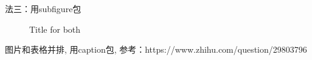 \documentclass{article}
\begin{document}
\begin{CJK}{UTF8}{gbsn}
法三：用subfigure包
\begin{figure}[!h]
	\hfill
	\hfill
	\hfill
	\caption{Title for both}
\end{figure}




图片和表格并排, 用caption包, 参考：https://www.zhihu.com/question/29803796


\end{CJK}
\end{document}
